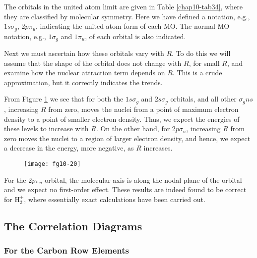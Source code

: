 The orbitals in the united atom limit are given in Table
\ref{chap10-tab34}, where they are classified by molecular symmetry.
Here we have defined a notation, e.g., $1s \sigma_g$, $2 p \pi_u$,
indicating the united atom form of each MO.  The normal
MO notation, e.g., $1 \sigma_g$ and $1 \pi_u$, of each
orbital is also indicated.
	
Next we must ascertain how these orbitals vary with $R$.  To do 
this we will assume that the shape of the orbital does not 
change with $R$, for small $R$, and examine how the nuclear 
attraction term depends on $R$.  This is a crude approximation, 
but it correctly indicates the trends.
	
From Figure \ref{chap10-fig20} we see that for both the $1s \sigma_g$
and $2s \sigma_g$ orbitals, and all other $\sigma_g ns$, increasing
$R$ from zero, moves the nuclei from a point of maximum electron
density to a point of smaller electron density.  Thus, we expect the
energies of these levels to increase with $R$.  On the other hand, for
$2p \sigma_u$, increasing $R$ from zero moves the nuclei to a region
of larger electron density, and hence, we expect a decrease in the
energy, more negative, as $R$ increases.


\begin{figure}
\texttt{[image: fg10-20]}
\caption{}
\label{chap10-fig20}
\end{figure}

For the $2 p \pi_u$ orbital, the molecular axis is along the nodal 
plane of the orbital and we expect no first-order effect.  These 
results are indeed found to be correct for H$^+_2$, where essentially 
exact calculations have been carried out.

\subsection{The Correlation Diagrams}

\subsubsection{For the Carbon Row Elements}

